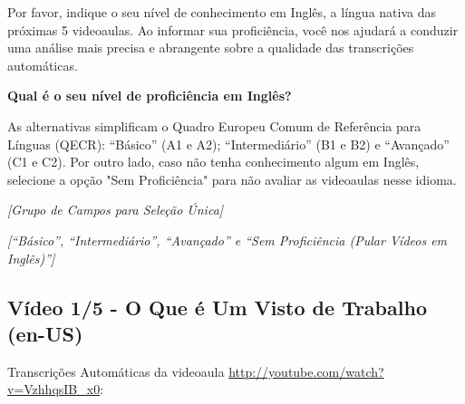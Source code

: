 \noindent
Por favor, indique o seu nível de conhecimento em Inglês, a língua nativa das próximas 5 
videoaulas. Ao informar sua proficiência, você nos ajudará a conduzir uma análise mais 
precisa e abrangente sobre a qualidade das transcrições automáticas.

\noindent
\textbf{Qual é o seu nível de proficiência em Inglês?}

\noindent
As alternativas simplificam o Quadro Europeu Comum de Referência para Línguas (QECR): ``Básico'' (A1 e A2); ``Intermediário'' (B1 e B2) e ``Avançado'' (C1 e C2). Por outro lado, caso não tenha conhecimento algum em Inglês, selecione a opção "Sem Proficiência" para não avaliar as videoaulas nesse idioma.

\noindent
\textit{[Grupo de Campos para Seleção Única]}

\noindent
\textit{[``Básico'', ``Intermediário'', ``Avançado'' e ``Sem Proficiência (Pular Vídeos em Inglês)'']}

\subsection{Vídeo 1/5 - O Que é Um Visto de Trabalho (en-US)}

\noindent
Transcrições Automáticas da videoaula \url{http://youtube.com/watch?v=VzhhqsIB_x0}:


